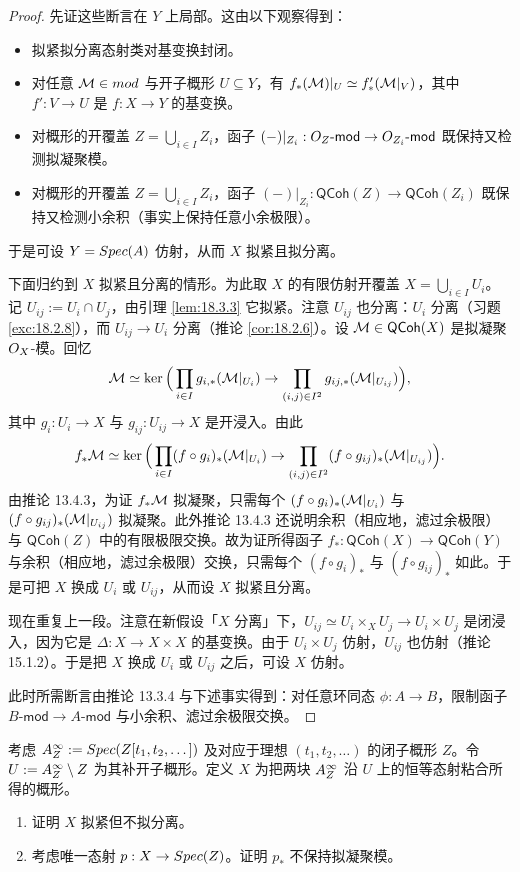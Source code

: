 \begin{proof}
先证这些断言在 $Y$ 上局部。这由以下观察得到：
\begin{itemize}[leftmargin=1.5em,itemsep=0.15ex]
  \item 拟紧拟分离态射类对基变换封闭。
  \item 对任意 $\mathcal{M}\in mod$ 与开子概形 $U\subseteq Y$，有 $f_*(\mathcal{M})|_U\simeq f'_*(\mathcal{M}|_V)$，其中 $f':V\to U$ 是 $f:X\to Y$ 的基变换。
  \item 对概形的开覆盖 $Z=\bigcup_{i\in I}Z_i$，函子 $(-)|_{Z_i}:O_Z\text{-}\mathsf{mod}\to O_{Z_i}\text{-}\mathsf{mod}$ 既保持又检测拟凝聚模。
  \item 对概形的开覆盖 $Z=\bigcup_{i\in I}Z_i$，函子 $(-)|_{Z_i}:\mathsf{QCoh}(Z)\to\mathsf{QCoh}(Z_i)$ 既保持又检测小余积（事实上保持任意小余极限）。
\end{itemize}
于是可设 $Y=Spec(A)$ 仿射，从而 $X$ 拟紧且拟分离。

下面归约到 $X$ 拟紧且分离的情形。为此取 $X$ 的有限仿射开覆盖 $X=\bigcup_{i\in I}U_i$。记 $U_{ij}:=U_i\cap U_j$，由引理 \ref{lem:18.3.3} 它拟紧。注意 $U_{ij}$ 也分离：$U_i$ 分离（习题 \ref{exc:18.2.8}），而 $U_{ij}\to U_i$ 分离（推论 \ref{cor:18.2.6}）。设 $\mathcal{M}\in\mathsf{QCoh}(X)$ 是拟凝聚 $O_X$-模。回忆
\[
\mathcal{M}\simeq\ker\Big(\prod_{i\in I}g_{i,*}(\mathcal{M}|_{U_i})\to\prod_{(i,j)\in I^2}g_{ij,*}(\mathcal{M}|_{U_{ij}})\Big),
\]
其中 $g_i:U_i\to X$ 与 $g_{ij}:U_{ij}\to X$ 是开浸入。由此
\[
f_*\mathcal{M}\simeq\ker\Big(\prod_{i\in I}(f\circ g_i)_*(\mathcal{M}|_{U_i})\to\prod_{(i,j)\in I^2}(f\circ g_{ij})_*(\mathcal{M}|_{U_{ij}})\Big).
\]
由推论 13.4.3，为证 $f_*\mathcal{M}$ 拟凝聚，只需每个 $(f\circ g_i)_*(\mathcal{M}|_{U_i})$ 与 $(f\circ g_{ij})_*(\mathcal{M}|_{U_{ij}})$ 拟凝聚。此外推论 13.4.3 还说明余积（相应地，滤过余极限）与 $\mathsf{QCoh}(Z)$ 中的有限极限交换。故为证所得函子 $f_*:\mathsf{QCoh}(X)\to\mathsf{QCoh}(Y)$ 与余积（相应地，滤过余极限）交换，只需每个 $(f\circ g_i)_*$ 与 $(f\circ g_{ij})_*$ 如此。于是可把 $X$ 换成 $U_i$ 或 $U_{ij}$，从而设 $X$ 拟紧且分离。

现在重复上一段。注意在新假设「$X$ 分离」下，$U_{ij}\simeq U_i\times_X U_j\to U_i\times U_j$ 是闭浸入，因为它是 $\Delta:X\to X\times X$ 的基变换。由于 $U_i\times U_j$ 仿射，$U_{ij}$ 也仿射（推论 15.1.2）。于是把 $X$ 换成 $U_i$ 或 $U_{ij}$ 之后，可设 $X$ 仿射。

此时所需断言由推论 13.3.4 与下述事实得到：对任意环同态 $\phi:A\to B$，限制函子 $B\text{-}\mathsf{mod}\to A\text{-}\mathsf{mod}$ 与小余积、滤过余极限交换。
\end{proof}

\begin{exercise}\label{exc:18.4.2}
考虑 $A^\infty_Z:=Spec(Z[t_1,t_2,\dots])$ 及对应于理想 $(t_1,t_2,\dots)$ 的闭子概形 $Z$。令 $U:=A^\infty_Z\setminus Z$ 为其补开子概形。定义 $X$ 为把两块 $A^\infty_Z$ 沿 $U$ 上的恒等态射粘合所得的概形。
\begin{enumerate}[label=(\roman*),leftmargin=2em,itemsep=0.25ex]
  \item 证明 $X$ 拟紧但不拟分离。
  \item 考虑唯一态射 $p:X\to Spec(Z)$。证明 $p_*$ 不保持拟凝聚模。
\end{enumerate}
\end{exercise}

